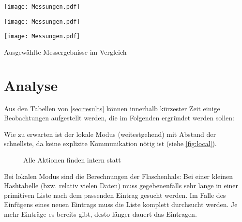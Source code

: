 \documentclass{scrreprt}
\begin{document}
\begin{table}[!ht]
\centering
\texttt{[image: Messungen.pdf]}
\caption{Messergebnisse im Modus \lstinline|distributed| mit 32 Maschinen}
\label{tab:dist32}
\end{table}

\begin{table}[!ht]
\centering
\texttt{[image: Messungen.pdf]}
\caption{Messergebnisse im Modus \lstinline|distributed| mit 42 Maschinen}
\label{tab:dist42}
\end{table}

\begin{table}[!ht]
\centering
\texttt{[image: Messungen.pdf]}
\caption{Ausgewählte Messergebnisse im Vergleich}
\label{tab:graphs}
\end{table}

\clearpage

\section{Analyse}

Aus den Tabellen von \autoref{sec:results} können innerhalb kürzester Zeit einige Beobachtungen aufgestellt werden, die im Folgenden ergründet werden sollen:\bigskip

Wie zu erwarten ist der lokale Modus (weitestgehend) mit Abstand der schnellste, da keine explizite Kommunikation nötig ist (siehe \autoref{fig:local}). %
\begin{figure}[!ht]
\centering
{}
\caption{Alle Aktionen finden intern statt}
\label{fig:local}
\end{figure}%
Bei lokalen Modus sind die Berechnungen der Flaschenhals: Bei einer kleinen Hashtabelle (bzw. relativ vielen Daten) muss gegebenenfalls sehr lange in einer primitiven Liste nach dem passenden Eintrag gesucht werden. Im Falle des Einfügens eines neuen Eintrags muss die Liste komplett durchsucht werden. Je mehr Einträge es bereits gibt, desto länger dauert das Eintragen. \bigskip
\end{document}
